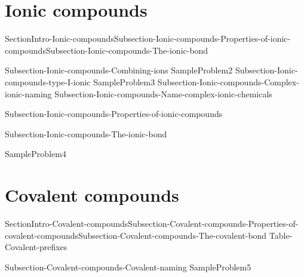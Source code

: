 \documentclass[main.tex]{subfiles}
\newcommand\chapterlabel{Ch-naming}\setcounter{figurenewcounter}{0}\setcounter{tablenewcounter}{0}\setcounter{formulanewcounter}{0}
\begin{document}
\section{Ionic compounds}
{SectionIntro-Ionic-compounds}{Subsection-Ionic-compounds-Properties-of-ionic-compounds}{Subsection-Ionic-compounds-The-ionic-bond}
\sloppy \begin{description}
{Subsection-Ionic-compounds-Combining-ions}
{SampleProblem2}
{Subsection-Ionic-compounds-type-I-ionic}
{SampleProblem3}
{Subsection-Ionic-compounds-Complex-ionic-naming}
{Subsection-Ionic-compounds-Name-complex-ionic-chemicals}


\item[\docfilehook{Properties of ionic compounds}{}]{Subsection-Ionic-compounds-Properties-of-ionic-compounds}
\item[\docfilehook{The ionic bond}{ }]{Subsection-Ionic-compounds-The-ionic-bond}
\end{description}
{SampleProblem4}
\section{Covalent compounds}
{SectionIntro-Covalent-compounds}{Subsection-Covalent-compounds-Properties-of-covalent-compounds}{Subsection-Covalent-compounds-The-covalent-bond}
 {Table-Covalent-prefixes}	

\sloppy \begin{description}
{Subsection-Covalent-compounds-Covalent-naming}
{SampleProblem5}
\end{description}
\end{document}

